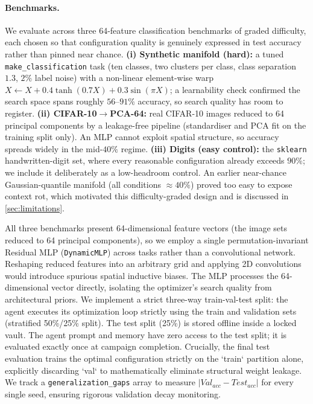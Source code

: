 \documentclass[conference]{IEEEtran}
\begin{document}
\paragraph{Benchmarks.} We evaluate across three 64-feature classification benchmarks of graded difficulty, each chosen so that configuration quality is genuinely expressed in test accuracy rather than pinned near chance. \textbf{(i) Synthetic manifold (hard):} a tuned \texttt{make\_classification} task (ten classes, two clusters per class, class separation $1.3$, $2\%$ label noise) with a non-linear element-wise warp $X \leftarrow X + 0.4\tanh(0.7X) + 0.3\sin(\pi X)$; a learnability check confirmed the search space spans roughly $56$--$91\%$ accuracy, so search quality has room to register. \textbf{(ii) CIFAR-10$\to$PCA-64:} real CIFAR-10 images reduced to 64 principal components by a leakage-free pipeline (standardiser and PCA fit on the training split only). An MLP cannot exploit spatial structure, so accuracy spreads widely in the mid-$40\%$ regime. \textbf{(iii) Digits (easy control):} the \texttt{sklearn} handwritten-digit set, where every reasonable configuration already exceeds $90\%$; we include it deliberately as a low-headroom control. An earlier near-chance Gaussian-quantile manifold (all conditions $\approx 40\%$) proved too easy to expose context rot, which motivated this difficulty-graded design and is discussed in \cref{sec:limitations}.

All three benchmarks present 64-dimensional feature vectors (the image sets reduced to 64 principal components), so we employ a single permutation-invariant Residual MLP (\texttt{DynamicMLP}) across tasks rather than a convolutional network. Reshaping reduced features into an arbitrary grid and applying 2D convolutions would introduce spurious spatial inductive biases. The MLP processes the 64-dimensional vector directly, isolating the optimizer's search quality from architectural priors. We implement a strict three-way train-val-test split: the agent executes its optimization loop strictly using the train and validation sets (stratified 50\%/25\% split). The test split (25\%) is stored offline inside a locked vault. The agent prompt and memory have zero access to the test split; it is evaluated exactly once at campaign completion. Crucially, the final test evaluation trains the optimal configuration strictly on the `train` partition alone, explicitly discarding `val` to mathematically eliminate structural weight leakage. We track a \texttt{generalization\_gaps} array to measure $|Val_{acc} - Test_{acc}|$ for every single seed, ensuring rigorous validation decay monitoring.
\end{document}
